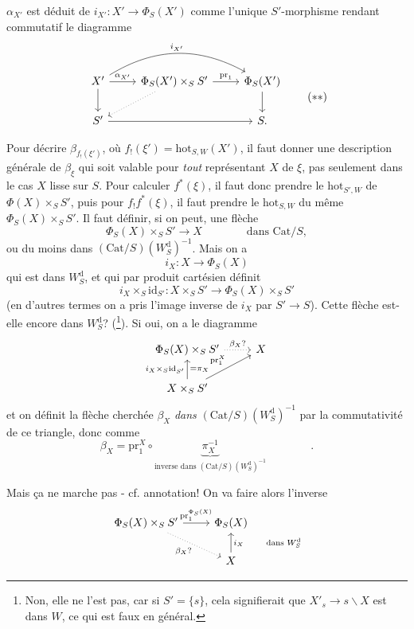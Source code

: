 \documentclass[11pt]{article}
\newcommand{\printedpage}[1]{\marginpar{\footnotesize p.~#1}}
\newcommand{\msp}[1]{\marginpar{\footnotesize [#1]}}
\newcommand{\Cat}{\mathrm{Cat}}
\newcommand{\id}{\mathrm{id}}
\newcommand{\hot}{\mathrm{hot}}
\newcommand{\pr}{\mathrm{pr}}
\newcommand{\Wd}{W^{\mathrm{d}}}
\begin{document}
$\alpha_{X'}$ est déduit de $i_{X'} : X'\longrightarrow\Phi_S(X')$ comme l'unique $S'$-morphisme rendant commutatif le diagramme
\[
\begin{tikzcd}
X' \arrow[r, "{\alpha_{X'}}"] \arrow[d] \arrow[rr, bend left, "{i_{X'}}"] & \Phi_S(X')\times_S S' \arrow[r, "\pr_1"] \arrow[dl, dotted] & \Phi_S(X') \arrow[d] \\ %
S' \arrow[rr] & & S.
\end{tikzcd}
\tag*{$(**)$}
\]

Pour décrire $\beta_{f_!(\xi')}$, où $f_!(\xi') = \hot_{S,W}(X')$, il faut donner une description générale de $\beta_\xi$ qui soit valable pour \textit{tout} représentant $X$ de $\xi$, pas seulement dans le cas $X$ lisse sur $S$. Pour calculer $f^*(\xi)$, il faut donc prendre le $\hot_{S',W}$ de $\Phi(X)\times_S S'$, puis pour $f_!f^*(\xi)$, il \msp{page 142}faut prendre le $\hot_{S,W}$ du même $\Phi_S(X)\times_S S'$. Il faut définir, si on peut, une flèche
\[
\Phi_S(X)\times_S S' \longrightarrow X \qquad\qquad \text{dans } \Cat/S,
\]
ou du moins dans $(\Cat/S)(\Wd_S)^{-1}$. Mais on a
\[
i_X : X \longrightarrow \Phi_S(X)
\]
qui est dans $\Wd_S$, et qui par produit cartésien définit
\[
i_X\times_S\id_{S'} : X\times_S S' \longrightarrow \Phi_S(X)\times_S S'
\]
(en d'autres termes on a pris l'image inverse de $i_X$ par $S'\longrightarrow S$). Cette flèche est-elle encore dans $\Wd_S$? (\footnote[69]{Non, elle ne l'est pas, car si $S'=\{s\}$, cela signifierait que $X'_s\longrightarrow s\backslash X$ est dans $W$, ce qui est faux en général.}). Si oui, on a le diagramme
\printedpage{87}
\[
\begin{tikzcd}
\Phi_S(X)\times_S S' \arrow[r, dotted, "\beta_X ?"] & X \\
X\times_S S' \arrow[u, "{i_X\times_S\id_{S'}}", "{=\pi_X}"'] \arrow[ur, "\pr_1^X"] &
\end{tikzcd}
\]
et on définit la flèche cherchée $\beta_X$ \textit{dans} $(\Cat/S)(\Wd_S)^{-1}$ par la commutativité de ce triangle, donc comme
\[
\beta_X = \pr_1^X\circ\underbrace{\pi_X^{-1}}_{\text{inverse dans }(\Cat/S)(\Wd_S)^{-1}} \qquad\qquad .
\]

\leavevmode\msp{page 143}Mais ça ne marche pas - cf. annotation! On va faire alors l'inverse
\[
\begin{tikzcd}
\Phi_S(X)\times_S S' \arrow[r, "\pr_1^{\Phi_S(X)}"] \arrow[dr, dotted, "\beta_X ?"'] & \Phi_S(X) \\
 & X \arrow[u, "{i_X \qquad \text{dans } \Wd_S}"']
\end{tikzcd}
\]
\end{document}

